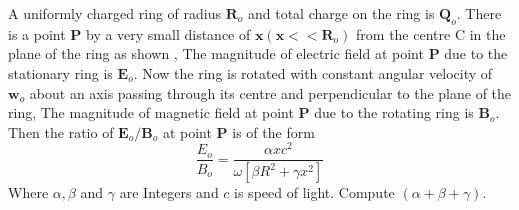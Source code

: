 \documentclass[11pt,a4paper]{scrartcl}
\begin{document}
\begin{problem}


A uniformly charged ring of radius $\boldsymbol{R}_{o}$ and total charge on the ring is $\boldsymbol{Q}_{o}$. There is a point $\boldsymbol{P}$ by a very small distance of $\boldsymbol{x}\left(\boldsymbol{x}<<\boldsymbol{R}_{o}\right)$ from the centre C in the plane of the ring as shown , The magnitude of electric field at point $\boldsymbol{P}$ due to the stationary ring is $\boldsymbol{E}_{o}$. Now the ring is rotated with constant angular velocity of $\boldsymbol{w}_{o}$ about an axis passing through its centre and perpendicular to the plane of the ring, The magnitude of magnetic field at point $\boldsymbol{P}$ due to the rotating ring is $\boldsymbol{B}_{o}$. Then the ratio of $\boldsymbol{E}_{o} / \boldsymbol{B}_{o}$ at point $\boldsymbol{P}$ is of the form $$ \frac{E_{o}}{B_{o}}=\frac{\alpha x c^{2}}{\omega\left[\beta R^{2}+\gamma  x^{2}\right]}$$ Where $\alpha, \beta$ and $\gamma $ are Integers and $c$ is speed of light. Compute $(\alpha+\beta+\gamma)$.
\vspace{5mm}
\begin{center}
    


\begin{tikzpicture}[x=0.75pt,y=0.75pt,yscale=-1,xscale=1]


\end{tikzpicture}
\end{center}
\end{problem}
\end{document}
